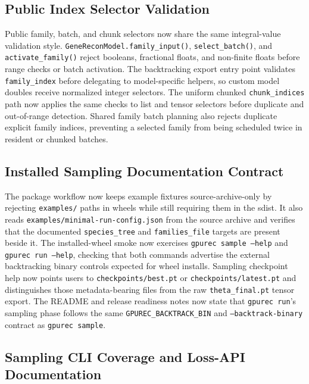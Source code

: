 \documentclass[11pt]{article}
\begin{document}
\subsection{Public Index Selector Validation}

Public family, batch, and chunk selectors now share the same integral-value
validation style.  \texttt{GeneReconModel.family\_input()},
\texttt{select\_batch()}, and \texttt{activate\_family()} reject booleans,
fractional floats, and non-finite floats before range checks or batch
activation.  The backtracking export entry point validates
\texttt{family\_index} before delegating to model-specific helpers, so custom
model doubles receive normalized integer selectors.  The uniform chunked
\texttt{chunk\_indices} path now applies the same checks to list and tensor
selectors before duplicate and out-of-range detection.  Shared family batch
planning also rejects duplicate explicit family indices, preventing a selected
family from being scheduled twice in resident or chunked batches.

\subsection{Installed Sampling Documentation Contract}

The package workflow now keeps example fixtures source-archive-only by
rejecting \texttt{examples/} paths in wheels while still requiring them in the
sdist.  It also reads \texttt{examples/minimal-run-config.json} from the
source archive and verifies that the documented \texttt{species\_tree} and
\texttt{families\_file} targets are present beside it.  The installed-wheel
smoke now exercises \texttt{gpurec sample --help} and
\texttt{gpurec run --help}, checking that both commands advertise the external
backtracking binary controls expected for wheel installs.  Sampling checkpoint
help now points users to \texttt{checkpoints/best.pt} or
\texttt{checkpoints/latest.pt} and distinguishes those metadata-bearing files
from the raw \texttt{theta\_final.pt} tensor export.  The README and release
readiness notes now state that \texttt{gpurec run}'s sampling phase follows
the same \texttt{GPUREC\_BACKTRACK\_BIN} and \texttt{--backtrack-binary}
contract as \texttt{gpurec sample}.

\subsection{Sampling CLI Coverage and Loss-API Documentation}
\end{document}
